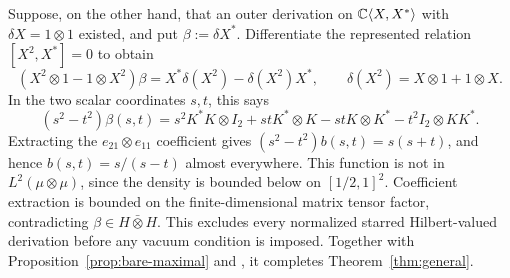 Suppose, on the other hand, that an outer derivation on $\mathbb C\langle X,X^*\rangle$ with $\delta X=1\otimes1$ existed, and put $\beta:=\delta X^*$.
Differentiate the represented relation $[X^2,X^*]=0$ to obtain
\[
 (X^2\otimes1-1\otimes X^2)\beta
 =X^*\delta(X^2)-\delta(X^2)X^*,\qquad
 \delta(X^2)=X\otimes1+1\otimes X.
\]
In the two scalar coordinates $s,t$, this says
\[
 (s^2-t^2)\beta(s,t)
 =s^2K^*K\otimes I_2+stK^*\otimes K-stK\otimes K^*-t^2I_2\otimes KK^*.
\]
Extracting the $e_{21}\otimes e_{11}$ coefficient gives $(s^2-t^2)b(s,t)=s(s+t)$, and hence $b(s,t)=s/(s-t)$ almost everywhere.
This function is not in $L^2(\mu\otimes\mu)$, since the density is bounded below on $[1/2,1]^2$.
Coefficient extraction is bounded on the finite-dimensional matrix tensor factor, contradicting $\beta\in H\bar\otimes H$.
This excludes every normalized starred Hilbert-valued derivation before any vacuum condition is imposed.
Together with Proposition~\ref{prop:bare-maximal} and \cite[Proposition~3.5]{ACSY24}, it completes Theorem~\ref{thm:general}.
